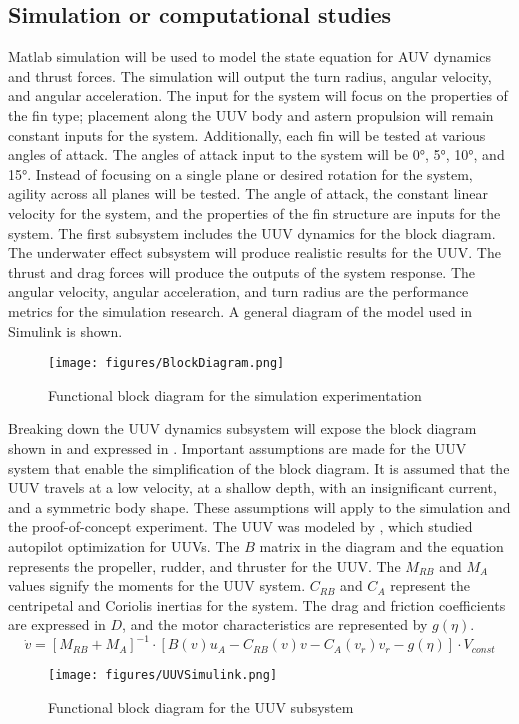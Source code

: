 \documentclass[]{IEEEtran}
\begin{document}
\subsection{Simulation or computational studies}
Matlab simulation will be used to model the state equation for AUV dynamics and thrust forces.  The simulation will output the turn radius, angular velocity, and angular acceleration.  The input for the system will focus on the properties of the fin type; placement along the UUV body and astern propulsion will remain constant inputs for the system.  Additionally, each fin will be tested at various angles of attack.  The angles of attack input to the system will be \ang{0}, \ang{5}, \ang{10}, and \ang{15}.  Instead of focusing on a single plane or desired rotation for the system, agility across all planes will be tested.  The angle of attack, the constant linear velocity for the system, and the properties of the fin structure are inputs for the system.  The first subsystem includes the UUV dynamics for the block diagram.  The underwater effect subsystem will produce realistic results for the UUV.  The thrust and drag forces will produce the outputs of the system response.  The angular velocity, angular acceleration, and turn radius are the performance metrics for the simulation research.  A general diagram of the model used in Simulink is shown. 
\begin{figure*}
\begin{center}
\texttt{[image: figures/BlockDiagram.png]}
\end{center}
\caption{Functional block diagram for the simulation experimentation}
\label{fig:3}
\end{figure*}

Breaking down the UUV dynamics subsystem will expose the block diagram shown in  and expressed in .  Important assumptions are made for the UUV system that enable the simplification of the block diagram.  It is assumed that the UUV travels at a low velocity, at a shallow depth, with an insignificant current, and a symmetric body shape.  These assumptions will apply to the simulation and the proof-of-concept experiment.  The UUV was modeled by \cite{taubert2014model}, which studied autopilot optimization for UUVs.  The $B$ matrix in the diagram and the equation represents the propeller, rudder, and thruster for the UUV.  The $M_{RB}$ and $M_A$ values signify the moments for the UUV system.  $C_{RB}$ and $C_A$ represent the centripetal and Coriolis inertias for the system.  The drag and friction coefficients are expressed in $D$, and the motor characteristics are represented by $g(\eta)$.  
\begin{equation}
\dot{v} = 
\left[ M_{RB} + M_A \right]^{-1} \cdot
\left[ B(v) u_A - C_{RB}(v) v - C_A(v_r)v_r - g(\eta) \right] \cdot
V_{const}
\label{eq:1}
\end{equation}
\begin{figure*}
\begin{center}
\texttt{[image: figures/UUVSimulink.png]}
\end{center}
\caption{Functional block diagram for the UUV subsystem \cite{taubert2014model}}
\label{fig:4}
\end{figure*}
\end{document}
